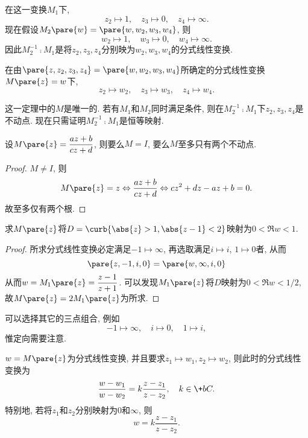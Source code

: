 \documentclass[../ComplexVariable.tex]{subfiles}
\begin{document}
在这一变换$M_1$下,
\[ z_2 \mapsto 1,\quad z_3\mapsto 0,\quad z_4\mapsto \infty. \]
现在假设$M_2\pare{w}=\pare{w,w_2,w_3,w_4}$, 则
\[ w_2 \mapsto 1,\quad w_3\mapsto 0,\quad w_4\mapsto \infty. \]
因此$M_2^{-1}\comp M_1$是将$z_2,z_3,z_4$分别映为$w_2,w_3,w_4$的分式线性变换.
\begin{theorem}
    在由$\pare{z,z_2,z_3,z_4} = \pare{w,w_2,w_3,w_4}$所确定的分式线性变换$M\pare{z} = w$下,
    \[ z_2 \mapsto w_2, \quad z_3\mapsto w_3,\quad z_4\mapsto w_4. \]
\end{theorem}
\begin{remark}
    这一定理中的$M$是唯一的. 若有$M_1$和$M_2$同时满足条件, 则在$M_2^{-1}\comp M_1$下$z_2,z_3,z_4$是不动点. 现在只需证明$M_2^{-1}\comp M_1$是恒等映射.
\end{remark}
\begin{lemma}
    设$M\pare{z} = \displaystyle \frac{az+b}{cz+d}$, 则要么$M=I$, 要么$M$至多只有两个不动点.
\end{lemma}
\begin{proof}
    $M\neq I$, 则
    \[ M\pare{z} = z \Leftrightarrow \frac{az+b}{cz+d} \Leftrightarrow cz^2 + dz-az+b = 0. \]
    故至多仅有两个根.
\end{proof}
\begin{sample}
    \begin{ex}
        求$M\pare{z}$将$D = \curb{\abs{z}>1, \abs{z-1}<2}$映射为$0<\Re w<1$.
    \end{ex}
    \begin{proof}
        所求分式线性变换必定满足$-1\mapsto \infty$, 再选取满足$i\mapsto i$, $1\mapsto 0$者, 从而
        \[ \pare{z, -1, i, 0} = \pare{w,\infty, i, 0} \]
        从而$w = M_1\pare{z} = \displaystyle \frac{z-1}{z+1}$. 可以发现$M_1\pare{z}$将$D$映射为$0 < \Re w < 1/2$, 故$M\pare{z} = 2M_1\pare{z}$为所求.
    \end{proof}
    \begin{remark}
        可以选择其它的三点组合, 例如
        \[ -1\mapsto\infty,\quad i\mapsto 0,\quad 1\mapsto i, \]
        惟定向需要注意.
    \end{remark}
\end{sample}
\begin{corollary}
    $w=M\pare{z}$为分式线性变换, 并且要求$z_1\mapsto w_1, z_2\mapsto w_2$, 则此时的分式线性变换为
    \[ \frac{w-w_1}{w-w_2} = k \frac{z-z_1}{z-z_2},\quad k\in \+bC. \]
    特别地, 若将$z_1$和$z_2$分别映射为$0$和$\infty$, 则
    \[ w = k \frac{z-z_1}{z-z_2}. \]
\end{corollary}
\end{document}
